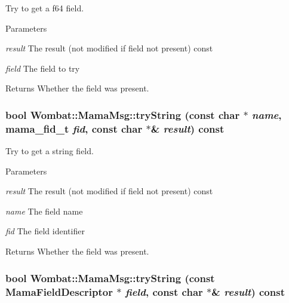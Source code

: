 Try to get a f64 field. 
\begin{DoxyParams}{Parameters}
\item[{\em result}]The result (not modified if field not present) const \item[{\em field}]The field to try \end{DoxyParams}
\begin{DoxyReturn}{Returns}
Whether the field was present. 
\end{DoxyReturn}
\hypertarget{classWombat_1_1MamaMsg_a3b75fcda7df849f4bdae109656afdb70}{
\subsubsection[{tryString}]{\setlength{\rightskip}{0pt plus 5cm}bool Wombat::MamaMsg::tryString (const char $\ast$ {\em name}, \/  mama\_\-fid\_\-t {\em fid}, \/  const char $\ast$\& {\em result}) const}}
\label{classWombat_1_1MamaMsg_a3b75fcda7df849f4bdae109656afdb70}


Try to get a string field. 
\begin{DoxyParams}{Parameters}
\item[{\em result}]The result (not modified if field not present) const \item[{\em name}]The field name \item[{\em fid}]The field identifier \end{DoxyParams}
\begin{DoxyReturn}{Returns}
Whether the field was present. 
\end{DoxyReturn}
\hypertarget{classWombat_1_1MamaMsg_a6c57f23554dfdc14ed2d5118d573bebf}{
\subsubsection[{tryString}]{\setlength{\rightskip}{0pt plus 5cm}bool Wombat::MamaMsg::tryString (const {\bf MamaFieldDescriptor} $\ast$ {\em field}, \/  const char $\ast$\& {\em result}) const}}
\label{classWombat_1_1MamaMsg_a6c57f23554dfdc14ed2d5118d573bebf}


